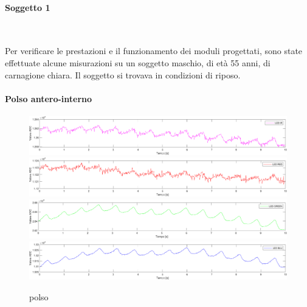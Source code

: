 \paragraph{Soggetto 1}~

Per verificare le prestazioni e il funzionamento dei moduli progettati, sono state effettuate alcune misurazioni su un soggetto maschio, di età 55 anni, di carnagione chiara. Il soggetto si trovava in condizioni di riposo.

\paragraph{Polso antero-interno}
\begin{figure}[h]
	\centering
	\includegraphics[width=1\linewidth]{ImageFiles/Misure Preliminari/Soggetto 1/polso_ired}
	\includegraphics[width=1\linewidth]{ImageFiles/Misure Preliminari/Soggetto 1/polso_red}
	\includegraphics[width=1\linewidth]{ImageFiles/Misure Preliminari/Soggetto 1/polso_green}
	\includegraphics[width=1\linewidth]{ImageFiles/Misure Preliminari/Soggetto 1/polso_blu}
	\caption{polso}
	\label{fig:Descrizione_Segnale_PPG}
\end{figure}


